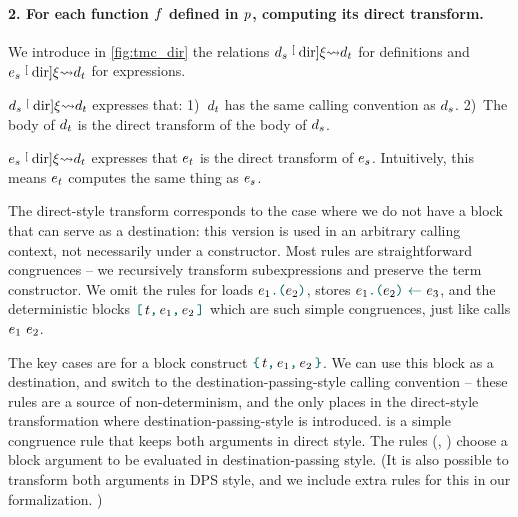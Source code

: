 
\paragraph{2. For each function $\datalangFn$ defined in $\datalangProg$, computing its direct transform.}
We introduce in \cref{fig:tmc_dir} the relations $\datalangDef_s \tmcDir{\datalangRenaming} \datalangDef_t$ for definitions and $\datalangExpr_s \tmcDir{\datalangRenaming} \datalangDef_t$ for expressions.

$\datalangDef_s \tmcDir{\datalangRenaming} \datalangDef_t$ expresses that:
1)~$\datalangDef_t$ has the same calling convention as $\datalangDef_s$.
2)~The body of $\datalangDef_t$ is the direct transform of the body of $\datalangDef_s$.

$\datalangExpr_s \tmcDir{\datalangRenaming} \datalangDef_t$ expresses that $\datalangExpr_t$ is the direct transform of $\datalangExpr_s$.
Intuitively, this means $\datalangExpr_t$ computes the same thing as $\datalangExpr_s$.

The direct-style transform corresponds to the case where we do not have a block that can serve as a destination: this version is used in an arbitrary calling context, not necessarily under a constructor. Most rules are straightforward congruences -- we recursively transform subexpressions and preserve the term constructor. We omit the rules for loads $\datalangLoad{\datalangExpr_1}{\datalangExpr_2}$, stores $\datalangStore{\datalangExpr_1}{\datalangExpr_2}{\datalangExpr_3}$, and the deterministic blocks $\datalangBlockDet \datalangTag {\datalangExpr_1} {\datalangExpr_2}$ which are such simple congruences, just like calls $\datalangCall {\datalangExpr_1} {\datalangExpr_2}$.

The key cases are for a block construct $\datalangBlock \datalangTag {\datalangExpr_1} {\datalangExpr_2}$. We can use this block as a destination, and switch to the destination-passing-style calling convention -- these rules are a source of non-determinism, and the only places in the direct-style transformation where destination-passing-style is introduced.  is a simple congruence rule that keeps both arguments in direct style. The rules (, ) choose a block argument to be evaluated in destination-passing style. (It is also possible to transform both arguments in DPS style, and we include extra rules for this in our formalization. )

